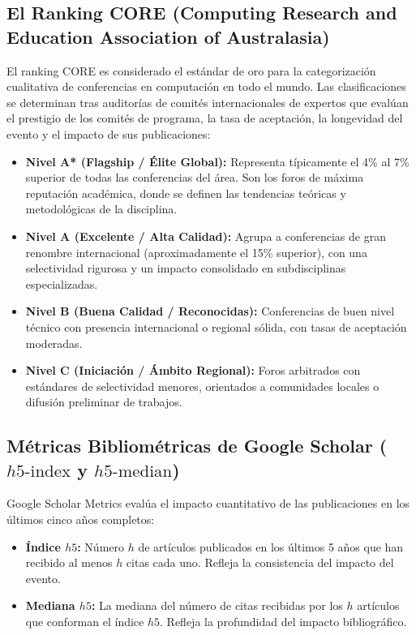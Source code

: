 \documentclass[12pt,a4paper]{article}
\begin{document}
\subsection{El Ranking CORE (Computing Research and Education Association of Australasia)}
El ranking CORE es considerado el estándar de oro para la categorización cualitativa de conferencias en computación en todo el mundo. Las clasificaciones se determinan tras auditorías de comités internacionales de expertos que evalúan el prestigio de los comités de programa, la tasa de aceptación, la longevidad del evento y el impacto de sus publicaciones:
\begin{itemize}[leftmargin=*]
    \item \textbf{Nivel A* (Flagship / Élite Global):} Representa típicamente el 4\% al 7\% superior de todas las conferencias del área. Son los foros de máxima reputación académica, donde se definen las tendencias teóricas y metodológicas de la disciplina.
    \item \textbf{Nivel A (Excelente / Alta Calidad):} Agrupa a conferencias de gran renombre internacional (aproximadamente el 15\% superior), con una selectividad rigurosa y un impacto consolidado en subdisciplinas especializadas.
    \item \textbf{Nivel B (Buena Calidad / Reconocidas):} Conferencias de buen nivel técnico con presencia internacional o regional sólida, con tasas de aceptación moderadas.
    \item \textbf{Nivel C (Iniciación / Ámbito Regional):} Foros arbitrados con estándares de selectividad menores, orientados a comunidades locales o difusión preliminar de trabajos.
\end{itemize}

\subsection{Métricas Bibliométricas de Google Scholar ($h5\text{-index}$ y $h5\text{-median}$)}
Google Scholar Metrics evalúa el impacto cuantitativo de las publicaciones en los últimos cinco años completos:
\begin{itemize}[leftmargin=*]
    \item \textbf{Índice $h5$:} Número $h$ de artículos publicados en los últimos 5 años que han recibido al menos $h$ citas cada uno. Refleja la consistencia del impacto del evento.
    \item \textbf{Mediana $h5$:} La mediana del número de citas recibidas por los $h$ artículos que conforman el índice $h5$. Refleja la profundidad del impacto bibliográfico.
\end{itemize}
\end{document}
